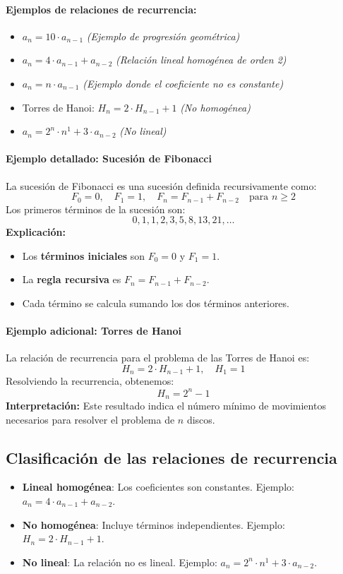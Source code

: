 \documentclass{article}
\begin{document}
\paragraph{Ejemplos de relaciones de recurrencia:}
\begin{itemize}
    \item $a_n = 10 \cdot a_{n-1}$ \hfill \textit{(Ejemplo de progresión geométrica)}
    \item $a_n = 4 \cdot a_{n-1} + a_{n-2}$ \hfill \textit{(Relación lineal homogénea de orden 2)}
    \item $a_n = n \cdot a_{n-1}$ \hfill \textit{(Ejemplo donde el coeficiente no es constante)}
    \item Torres de Hanoi: $H_n = 2 \cdot H_{n-1} + 1$ \hfill \textit{(No homogénea)}
    \item $a_n = 2^n \cdot n^1 + 3 \cdot a_{n-2}$ \hfill \textit{(No lineal)}
\end{itemize}

\newpage

\paragraph{Ejemplo detallado: Sucesión de Fibonacci}
La sucesión de Fibonacci es una sucesión definida recursivamente como:
\[
F_0 = 0, \quad F_1 = 1, \quad F_n = F_{n-1} + F_{n-2} \quad \text{para } n \geq 2
\]
Los primeros términos de la sucesión son:
\[
0, 1, 1, 2, 3, 5, 8, 13, 21, \dots
\]
\textbf{Explicación:}
\begin{itemize}
    \item Los \textbf{términos iniciales} son $F_0 = 0$ y $F_1 = 1$.
    \item La \textbf{regla recursiva} es $F_n = F_{n-1} + F_{n-2}$.
    \item Cada término se calcula sumando los dos términos anteriores.
\end{itemize}

\paragraph{Ejemplo adicional: Torres de Hanoi}
La relación de recurrencia para el problema de las Torres de Hanoi es:
\[
H_n = 2 \cdot H_{n-1} + 1, \quad H_1 = 1
\]
Resolviendo la recurrencia, obtenemos:
\[
H_n = 2^n - 1
\]
\textbf{Interpretación:} Este resultado indica el número mínimo de movimientos necesarios para resolver el problema de $n$ discos.

\subsection{Clasificación de las relaciones de recurrencia}
\begin{itemize}
    \item \textbf{Lineal homogénea}: Los coeficientes son constantes. Ejemplo: $a_n = 4 \cdot a_{n-1} + a_{n-2}$.
    \item \textbf{No homogénea}: Incluye términos independientes. Ejemplo: $H_n = 2 \cdot H_{n-1} + 1$.
    \item \textbf{No lineal}: La relación no es lineal. Ejemplo: $a_n = 2^n \cdot n^1 + 3 \cdot a_{n-2}$.
\end{itemize}
\end{document}
